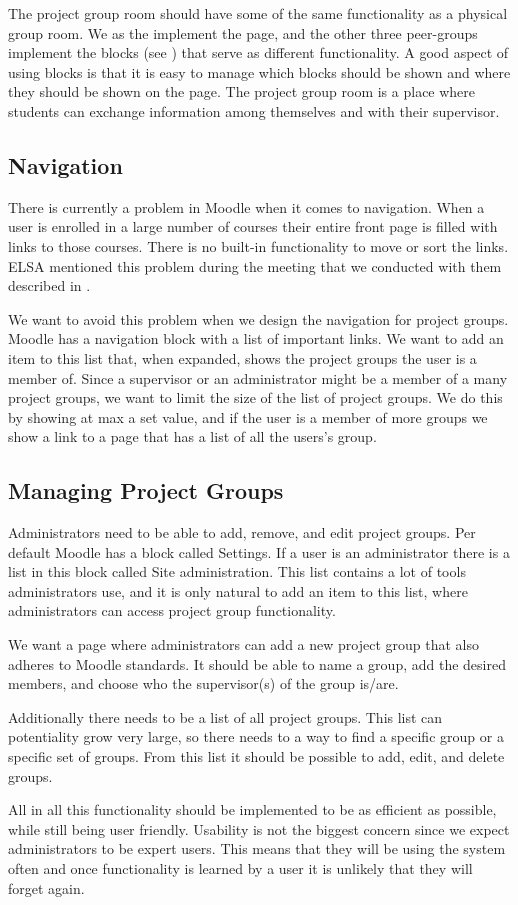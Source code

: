 The project group room should have some of the same functionality as a physical group room.
We as the \groupname{} implement the page, and the other three peer-groups implement the blocks (see ) that serve as different functionality.
A good aspect of using blocks is that it is easy to manage which blocks should be shown and where they should be shown on the page.
The project group room is a place where students can exchange information among themselves and with their supervisor.

\subsection{Navigation}
There is currently a problem in Moodle when it comes to navigation. 
When a user is enrolled in a large number of courses their entire front page is filled with links to those courses.
There is no built-in functionality to move or sort the links.
ELSA mentioned this problem during the meeting that we conducted with them described in .

We want to avoid this problem when we design the navigation for project groups.
Moodle has a navigation block with a list of important links.
We want to add an item to this list that, when expanded, shows the project groups the user is a member of.
Since a supervisor or an administrator might be a member of a many project groups, we want to limit the size of the list of project groups.
We do this by showing at max a set value, and if the user is a member of more groups we show a link to a page that has a list of all the users's group.

\subsection{Managing Project Groups}
\label{sec:s}
Administrators need to be able to add, remove, and edit project groups.
Per default Moodle has a block called Settings. 
If a user is an administrator there is a list in this block called Site administration. 
This list contains a lot of tools administrators use, and it is only natural to add an item to this list, where administrators can access project group functionality.

We want a page where administrators can add a new project group that also adheres to Moodle standards.
It should be able to name a group, add the desired members, and choose who the supervisor(s) of the group is/are.

Additionally there needs to be a list of all project groups.
This list can potentiality grow very large, so there needs to a way to find a specific group or a specific set of groups. 
From this list it should be possible to add, edit, and delete groups. 

All in all this functionality should be implemented to be as efficient as possible, while still being user friendly.
Usability is not the biggest concern since we expect administrators to be expert users.
This means that they will be using the system often and once functionality is learned by a user it is unlikely that they will forget again.